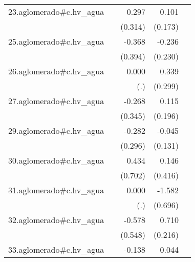 {\begin{longtable}{l*{4}{D{.}{.}{-1}}}
\addlinespace
23.aglomerado#c.hv\_agua&                     &       0.297         &       0.101         &                     \\
            &                     &     (0.314)         &     (0.173)         &                     \\
\addlinespace
25.aglomerado#c.hv\_agua&                     &      -0.368         &      -0.236         &                     \\
            &                     &     (0.394)         &     (0.230)         &                     \\
\addlinespace
26.aglomerado#c.hv\_agua&                     &       0.000         &       0.339         &                     \\
            &                     &         (.)         &     (0.299)         &                     \\
\addlinespace
27.aglomerado#c.hv\_agua&                     &      -0.268         &       0.115         &                     \\
            &                     &     (0.345)         &     (0.196)         &                     \\
\addlinespace
29.aglomerado#c.hv\_agua&                     &      -0.282         &      -0.045         &                     \\
            &                     &     (0.296)         &     (0.131)         &                     \\
\addlinespace
30.aglomerado#c.hv\_agua&                     &       0.434         &       0.146         &                     \\
            &                     &     (0.702)         &     (0.416)         &                     \\
\addlinespace
31.aglomerado#c.hv\_agua&                     &       0.000         &      -1.582\sym{*}  &                     \\
            &                     &         (.)         &     (0.696)         &                     \\
\addlinespace
32.aglomerado#c.hv\_agua&                     &      -0.578         &       0.710\sym{**} &                     \\
            &                     &     (0.548)         &     (0.216)         &                     \\
\addlinespace
33.aglomerado#c.hv\_agua&                     &      -0.138         &       0.044         &                     \\

\end{longtable}}
